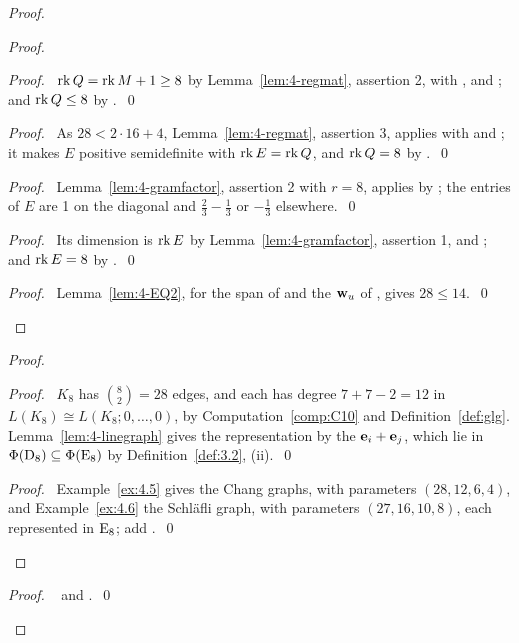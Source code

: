 \begin{proof}
\begin{proof}
  \begin{proof}\pf\ $\mathop{\mathrm{rk}}\nolimits Q=\mathop{\mathrm{rk}}\nolimits M+1\ge8$ by Lemma~\ref{lem:4-regmat}, assertion 2, with
   ,  and ; and $\mathop{\mathrm{rk}}\nolimits Q\le8$ by
   .~\qed\end{proof}
  \begin{proof}\pf\ As $28<2\cdot16+4$, Lemma~\ref{lem:4-regmat}, assertion 3, applies with
    and ; it makes $E$ positive semidefinite with $\mathop{\mathrm{rk}}\nolimits E=\mathop{\mathrm{rk}}\nolimits Q$, and
   $\mathop{\mathrm{rk}}\nolimits Q=8$ by .~\qed\end{proof}
  \begin{proof}\pf\ Lemma~\ref{lem:4-gramfactor}, assertion 2 with $r=8$, applies by
   ; the entries of $E$ are 1 on the diagonal and $\frac23-\frac13$ or
   $-\frac13$ elsewhere.~\qed\end{proof}
  \begin{proof}\pf\ Its dimension is $\mathop{\mathrm{rk}}\nolimits E$ by Lemma~\ref{lem:4-gramfactor}, assertion 1, and
   ; and $\mathop{\mathrm{rk}}\nolimits E=8$ by .~\qed\end{proof}
  \qedstep
  \begin{proof}\pf\ Lemma~\ref{lem:4-EQ2}, for the span of  and the ${\mathbf w}_u$
   of , gives $28\le14$.~\qed\end{proof}
 \end{proof}
 \begin{proof}
  \begin{proof}\pf\ $K_8$ has $\binom82=28$ edges, and each has degree $7+7-2=12$ in
   $L(K_8)\cong L(K_8;0,\dots,0)$, by Computation~\ref{comp:C10} and Definition~\ref{def:glg}.
   Lemma~\ref{lem:4-linegraph} gives the representation by the ${\mathbf e}_i+{\mathbf e}_j$, which lie in
   $\Phi(\mathrm{D}_8)\subseteq\Phi(\mathrm{E}_8)$ by Definition~\ref{def:3.2}, (ii).~\qed\end{proof}
  \qedstep
  \begin{proof}\pf\ Example~\ref{ex:4.5} gives the Chang graphs, with parameters
   $(28,12,6,4)$, and Example~\ref{ex:4.6} the Schl\"afli graph, with parameters $(27,16,10,8)$,
   each represented in $\mathrm{E}_8$; add .~\qed\end{proof}
 \end{proof}
 \qedstep
 \begin{proof}\pf\  and .~\qed\end{proof}
\end{proof}


